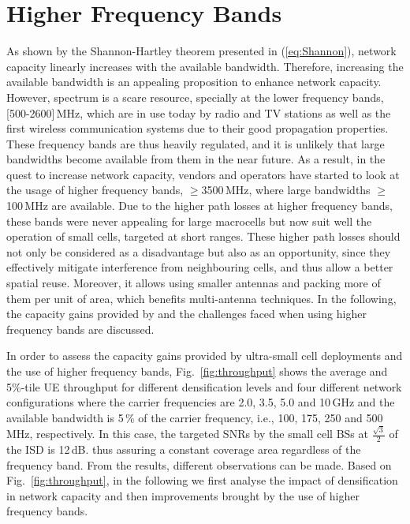 \documentclass{IEEEtran}
\begin{document}
\section{Higher Frequency Bands}
\label{Sec:higherFrequecnyBands}

As shown by the Shannon-Hartley theorem presented in (\ref{eq:Shannon}),
network capacity linearly increases with the available bandwidth.
Therefore, increasing the available bandwidth is an appealing proposition to enhance network capacity.
However, spectrum is a scare resource,
specially at the lower frequency bands, [500-2600]\,MHz,
which are in use today by radio and TV stations as well as the first wireless communication systems due to their good propagation properties.
These frequency bands are thus heavily regulated,
and it is unlikely that large bandwidths become available from them in the near future.
As a result,
in the quest to increase network capacity,
vendors and operators have started to look at the usage of higher frequency bands, $\geq$3500\,MHz,
where large bandwidths $\geq$100\,MHz are available.
Due to the higher path losses at higher frequency bands,
these bands were never appealing for large macrocells but now suit well the operation of small cells,
targeted at short ranges.
These higher path losses should not only be considered as a disadvantage but also as an opportunity,
since they effectively mitigate interference from neighbouring cells,
and thus allow a better spatial reuse.
Moreover, it allows using smaller antennas and packing more of them per unit of area, which benefits multi-antenna techniques.
In the following, the capacity gains provided by and the challenges faced when using higher frequency bands are discussed.

In order to assess the capacity gains provided by ultra-small cell deployments and the use of higher frequency bands,
Fig.~\ref{fig:throughput} shows the average and 5\%-tile UE throughput for different densification levels and four different network configurations
where the carrier frequencies are 2.0, 3.5, 5.0 and 10\,GHz and the available bandwidth is 5\,\% of the carrier frequency,
i.e., 100, 175, 250 and 500\,MHz, respectively.
In this case, the targeted \acp{SNR} by the small cell \acp{BS} at $\frac{\sqrt{3}}{2}$ of the \ac{ISD} is 12\,dB.
thus assuring a constant coverage area regardless of the frequency band.
From the results,
different observations can be made.
Based on Fig.~\ref{fig:throughput}, 
in the following we first analyse the impact of densification in network capacity and then improvements brought by the use of higher frequency bands.
\end{document}
